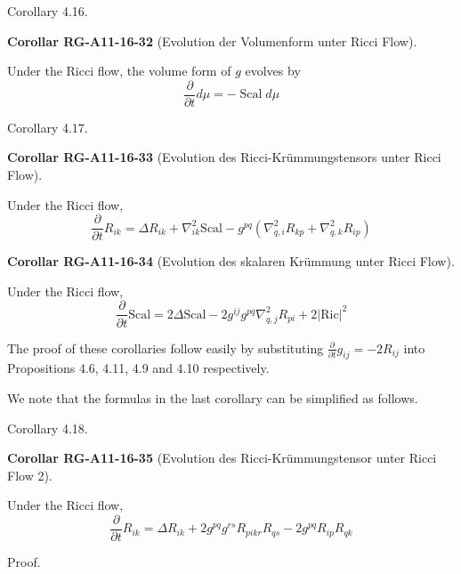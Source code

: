 \documentclass[10pt, letterpaper]{article}
\newcommand{\CustomHeading}[3]{%
  \par\medskip\noindent%
  \textbf{#1 #2} \textnormal{(#3)}.\enskip%
}
\newenvironment{KORO}[2]{\begin{unitbox}\CustomHeading{Corollar}{#1}{#2}}{\end{unitbox}}
\begin{document}
Corollary 4.16. 

\begin{KORO}{RG-A11-16-32}{Evolution der Volumenform unter Ricci Flow}
Under the Ricci flow, the volume form of $g$ evolves by
$$
\frac{\partial}{\partial t} d \mu=-\operatorname{Scal} d \mu
$$
\end{KORO}



Corollary 4.17. 

\begin{KORO}{RG-A11-16-33}{Evolution des Ricci-Krümmungstensors unter Ricci Flow}
Under the Ricci flow,
$$
\frac{\partial}{\partial t} R_{i k}  =\Delta R_{i k}+\nabla_{i k}^{2} \mathrm{Scal}-g^{p q}\left(\nabla_{q, i}^{2} R_{k p}+\nabla_{q, k}^{2} R_{i p}\right)
$$
\end{KORO}



\begin{KORO}{RG-A11-16-34}{Evolution des skalaren Krümmung unter Ricci Flow}
Under the Ricci flow,
$$\frac{\partial}{\partial t} \mathrm{Scal}  =2 \Delta \mathrm{Scal}-2 g^{i j} g^{p q} \nabla_{q, j}^{2} R_{p i}+2|\mathrm{Ric}|^{2}$$
\end{KORO}


The proof of these corollaries follow easily by substituting $\frac{\partial}{\partial t} g_{i j}=-2 R_{i j}$ into Propositions 4.6, 4.11, 4.9 and 4.10 respectively.

We note that the formulas in the last corollary can be simplified as follows.


Corollary 4.18. 

\begin{KORO}{RG-A11-16-35}{Evolution des Ricci-Krümmungstensor unter Ricci Flow 2}
Under the Ricci flow,
$$
\frac{\partial}{\partial t} R_{i k}=\Delta R_{i k}+2 g^{p q} g^{r s} R_{p i k r} R_{q s}-2 g^{p q} R_{i p} R_{q k}
$$
\end{KORO}



Proof. 
\end{document}
